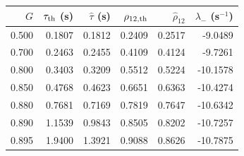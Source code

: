 \begin{tabular}{@{}rrrrrr@{}}
\toprule
$G$ & $\tau_{\rm th}$ (s) & $\widehat\tau$ (s) & $\rho_{12,\rm th}$ & $\widehat\rho_{12}$ & $\lambda_-$ (s$^{-1}$) \\
\midrule
0.500 & 0.1807 & 0.1812 & 0.2409 & 0.2517 & -9.0489 \\
0.700 & 0.2463 & 0.2455 & 0.4109 & 0.4124 & -9.7261 \\
0.800 & 0.3403 & 0.3209 & 0.5512 & 0.5224 & -10.1578 \\
0.850 & 0.4768 & 0.4623 & 0.6651 & 0.6363 & -10.4274 \\
0.880 & 0.7681 & 0.7169 & 0.7819 & 0.7647 & -10.6342 \\
0.890 & 1.1539 & 0.9843 & 0.8505 & 0.8202 & -10.7257 \\
0.895 & 1.9400 & 1.3921 & 0.9088 & 0.8626 & -10.7875 \\
\bottomrule
\end{tabular}
